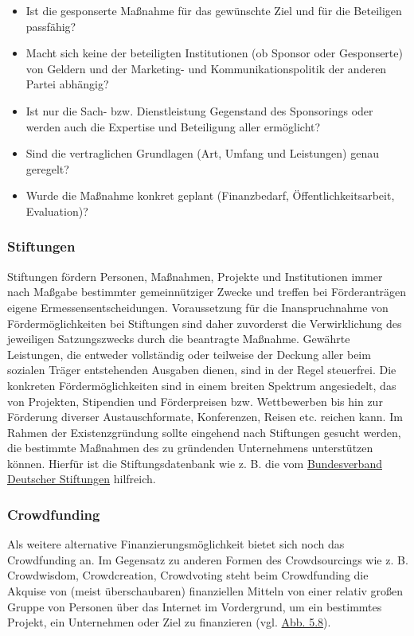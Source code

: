 \documentclass[
  letterpaper,
]{book}
\begin{document}
\begin{itemize}
\item
  Ist die gesponserte Maßnahme für das gewünschte Ziel und für die
  Beteiligen passfähig?
\item
  Macht sich keine der beteiligten Institutionen (ob Sponsor oder
  Gesponserte) von Geldern und der Marketing- und Kommunikationspolitik
  der anderen Partei abhängig?
\item
  Ist nur die Sach- bzw. Dienstleistung Gegenstand des Sponsorings oder
  werden auch die Expertise und Beteiligung aller ermöglicht?
\item
  Sind die vertraglichen Grundlagen (Art, Umfang und Leistungen) genau
  geregelt?
\item
  Wurde die Maßnahme konkret geplant (Finanzbedarf,
  Öffentlichkeitsarbeit, Evaluation)?
\end{itemize}

\subsubsection{Stiftungen}\label{stiftungen}

Stiftungen fördern Personen, Maßnahmen, Projekte und Institutionen immer
nach Maßgabe bestimmter gemeinnütziger Zwecke und treffen bei
Förderanträgen eigene Ermessensentscheidungen. Voraussetzung für die
Inanspruchnahme von Fördermöglichkeiten bei Stiftungen sind daher
zuvorderst die Verwirklichung des jeweiligen Satzungszwecks durch die
beantragte Maßnahme. Gewährte Leistungen, die entweder vollständig oder
teilweise der Deckung aller beim sozialen Träger entstehenden Ausgaben
dienen, sind in der Regel steuerfrei. Die konkreten Fördermöglichkeiten
sind in einem breiten Spektrum angesiedelt, das von Projekten,
Stipendien und Förderpreisen bzw. Wettbewerben bis hin zur Förderung
diverser Austauschformate, Konferenzen, Reisen etc. reichen kann. Im
Rahmen der Existenzgründung sollte eingehend nach Stiftungen gesucht
werden, die bestimmte Maßnahmen des zu gründenden Unternehmens
unterstützen können. Hierfür ist die Stiftungsdatenbank wie z. B. die
vom \href{http://www.stiftungssuche.de}{Bundesverband Deutscher
Stiftungen} hilfreich.

\subsubsection{Crowdfunding}\label{crowdfunding}

Als weitere alternative Finanzierungsmöglichkeit bietet sich noch das
Crowdfunding an. Im Gegensatz zu anderen Formen des Crowdsourcings wie
z. B. Crowdwisdom, Crowdcreation, Crowdvoting steht beim Crowdfunding
die Akquise von (meist überschaubaren) finanziellen Mitteln von einer
relativ großen Gruppe von Personen über das Internet im Vordergrund, um
ein bestimmtes Projekt, ein Unternehmen oder Ziel zu finanzieren (vgl.
\hyperref[figure58]{Abb. 5.8}).
\end{document}

